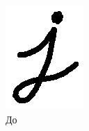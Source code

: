 	\begin{figure}[H]
		\centering
		\begin{subfigure}[b]{0.2\textwidth}
			\includegraphics[width=\textwidth]{theory/img/morph_before}
			\caption{До}
		\end{subfigure}
		\hfill
		\begin{subfigure}[b]{0.2\textwidth}

\end{subfigure}
\end{figure}
